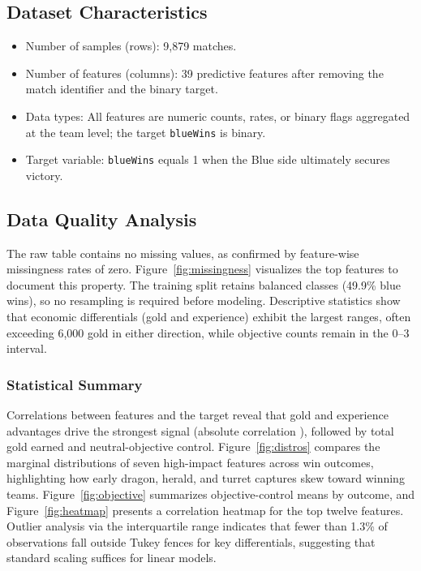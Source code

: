 \documentclass[aps,prl,preprint,groupedaddress]{revtex4-2}
\begin{document}
\subsection{Dataset Characteristics}
\begin{itemize}
    \item Number of samples (rows): 9,879 matches.
    \item Number of features (columns): 39 predictive features after removing the match identifier and the binary target.
    \item Data types: All features are numeric counts, rates, or binary flags aggregated at the team level; the target \texttt{blueWins} is binary.
    \item Target variable: \texttt{blueWins} equals 1 when the Blue side ultimately secures victory.
\end{itemize}

\subsection{Data Quality Analysis}
The raw table contains no missing values, as confirmed by feature-wise missingness rates of zero. Figure~\ref{fig:missingness} visualizes the top features to document this property. The training split retains balanced classes (49.9\% blue wins), so no resampling is required before modeling. Descriptive statistics show that economic differentials (gold and experience) exhibit the largest ranges, often exceeding 6,000 gold in either direction, while objective counts remain in the 0--3 interval.

\subsubsection{Statistical Summary}
Correlations between features and the target reveal that gold and experience advantages drive the strongest signal (absolute correlation ), followed by total gold earned and neutral-objective control. Figure~\ref{fig:distros} compares the marginal distributions of seven high-impact features across win outcomes, highlighting how early dragon, herald, and turret captures skew toward winning teams. Figure~\ref{fig:objective} summarizes objective-control means by outcome, and Figure~\ref{fig:heatmap} presents a correlation heatmap for the top twelve features. Outlier analysis via the interquartile range indicates that fewer than 1.3\% of observations fall outside Tukey fences for key differentials, suggesting that standard scaling suffices for linear models.
\end{document}

